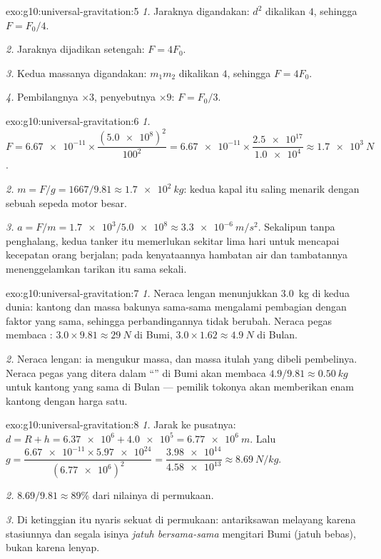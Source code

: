 \begin{solution}{exo:g10:universal-gravitation:5}
\emph{1.} Jaraknya digandakan: $d^2$ dikalikan $4$, sehingga
$F = F_0/4$.

\emph{2.} Jaraknya dijadikan setengah: $F = 4F_0$.

\emph{3.} Kedua massanya digandakan: $m_1 m_2$ dikalikan $4$, sehingga
$F = 4F_0$.

\emph{4.} Pembilangnya $\times 3$, penyebutnya $\times 9$:
$F = F_0/3$.
\end{solution}

\begin{solution}{exo:g10:universal-gravitation:6}
\emph{1.} $F = \num{6.67e-11} \times
\dfrac{(\num{5.0e8})^2}{100^2}
= \num{6.67e-11} \times \dfrac{\num{2.5e17}}{\num{1.0e4}}
\approx \qty{1.7e3}{N}$.

\emph{2.} $m = F/g = 1667/9.81 \approx \qty{1.7e2}{kg}$: kedua kapal
itu saling menarik dengan  sebuah sepeda motor besar.

\emph{3.} $a = F/m = \num{1.7e3}/\num{5.0e8} \approx
\qty{3.3e-6}{m/s^2}$. Sekalipun tanpa penghalang, kedua tanker itu
memerlukan sekitar lima hari untuk mencapai kecepatan orang berjalan;
pada kenyataannya hambatan air dan tambatannya menenggelamkan tarikan
itu sama sekali.
\end{solution}

\begin{solution}{exo:g10:universal-gravitation:7}
\emph{1.} Neraca lengan menunjukkan \qty{3.0}{kg} di kedua dunia:
kantong dan massa bakunya sama-sama mengalami pembagian  dengan
faktor yang sama, sehingga perbandingannya tidak berubah. Neraca pegas
membaca : $3.0 \times 9.81 \approx \qty{29}{N}$ di Bumi,
$3.0 \times 1.62 \approx \qty{4.9}{N}$ di Bulan.

\emph{2.} Neraca lengan: ia mengukur massa, dan massa itulah yang
dibeli pembelinya. Neraca pegas yang ditera dalam ``'' di Bumi
akan membaca $4.9/9.81 \approx \qty{0.50}{kg}$ untuk kantong yang sama
di Bulan --- pemilik tokonya akan memberikan enam kantong dengan harga
satu.
\end{solution}

\begin{solution}{exo:g10:universal-gravitation:8}
\emph{1.} Jarak ke pusatnya:
$d = R + h = \num{6.37e6} + \num{4.0e5} = \qty{6.77e6}{m}$. Lalu
$g = \dfrac{\num{6.67e-11} \times \num{5.97e24}}{(\num{6.77e6})^2}
= \dfrac{\num{3.98e14}}{\num{4.58e13}} \approx \qty{8.69}{N/kg}$.

\emph{2.} $8.69/9.81 \approx 89\%$ dari nilainya di permukaan.

\emph{3.} Di ketinggian itu  nyaris sekuat di permukaan:
antariksawan melayang karena stasiunnya dan segala isinya \emph{jatuh
bersama-sama} mengitari Bumi (jatuh bebas), bukan karena 
lenyap.
\end{solution}


